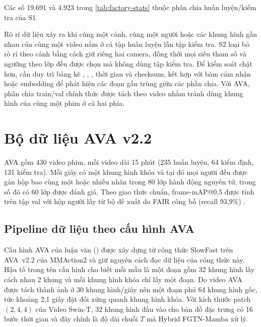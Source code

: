 Các số 19.691 và 4.923 trong \cref{tab:factory-stats} thuộc phân chia huấn luyện/kiểm tra của S1.

Rò rỉ dữ liệu xảy ra khi cùng một cảnh, cùng một người hoặc các khung hình gần nhau của cùng một video nằm ở cả tập huấn luyện lẫn tập kiểm tra. S2 loại bỏ rò rỉ theo cảnh bằng cách giữ riêng hai camera, đồng thời mọi siêu tham số và ngưỡng theo lớp đều được chọn mà không dùng tập kiểm tra. Để kiểm soát chặt hơn, cần duy trì bảng kê , , , thời gian và checksum, kết hợp với băm cảm nhận hoặc embedding để phát hiện các đoạn gần trùng giữa các phần chia. Với AVA, phân chia train/val chính thức được tách theo video nhằm tránh dùng khung hình của cùng một phim ở cả hai phía.

\section{Bộ dữ liệu AVA v2.2}
\label{sec:ava}

AVA \cite{gu2018ava} gồm 430 video phim, mỗi video dài 15 phút (235 huấn luyện, 64 kiểm định, 131 kiểm tra). Mỗi giây có một khung hình khóa và tại đó mọi người đều được gán hộp bao cùng một hoặc nhiều nhãn trong 80 lớp hành động nguyên tử, trong số đó có 60 lớp được đánh giá. Theo giao thức chuẩn, frame-mAP@0,5 được tính trên tập val với hộp người lấy từ bộ đề xuất do FAIR công bố (recall 93,9\%) \cite{feichtenhofer2019slowfast,mmaction2}.

\subsection{Pipeline dữ liệu theo cấu hình AVA}
\label{sec:ava-pipeline}

Cấu hình AVA của luận văn () được xây dựng từ công thức SlowFast trên AVA~v2.2 của MMAction2 \cite{mmaction2} và giữ nguyên cách đọc dữ liệu của công thức này. Hậu tố  trong tên cấu hình cho biết mỗi mẫu là một đoạn gồm 32 khung hình lấy cách nhau 2 khung và mỗi khung hình khóa chỉ lấy một đoạn. Do video AVA được tách thành ảnh ở 30 khung hình/giây nên một đoạn phủ 64 khung hình gốc, tức khoảng 2,1 giây đặt đối xứng quanh khung hình khóa. Với kích thước patch $(2, 4, 4)$ của Video Swin-T, 32 khung hình đầu vào cho bản đồ đặc trưng có 16 bước thời gian và đây chính là độ dài chuỗi $T$ mà Hybrid FGTN-Mamba xử lý.

